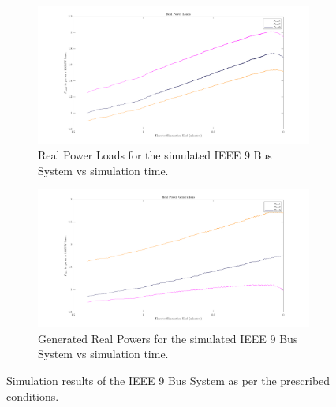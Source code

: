 \begin{figure}[!ht]
	\centering
	\begin{subfigure}{\textwidth}
		\centering
		\includegraphics[scale=0.25]{../figures/analysis_matlab/ploads_run02}
		\caption{Real Power Loads for the simulated IEEE 9 Bus System vs simulation time.}
	\end{subfigure}
	
	\begin{subfigure}{\textwidth}
		\centering
		\includegraphics[scale=0.25]{../figures/analysis_matlab/pgens_run02}
		\caption{Generated Real Powers for the simulated IEEE 9 Bus System vs simulation time.}
	\end{subfigure}

	\caption{Simulation results of the IEEE 9 Bus System as per the prescribed conditions.}
	\label{fig:psse_run02}
\end{figure}

